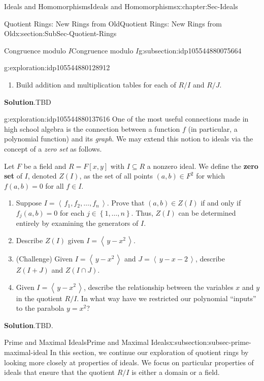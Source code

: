 \documentclass[oneside,10pt,]{book}
\newcommand{\blocktitlefont}{\relax}
\newcommand{\terminology}[1]{\textbf{#1}}
\numberwithin{equation}{section}
\newcommand{\ideal}[1]{\left\langle\, #1 \,\right\rangle}
\newcommand{\set}[1]{\left\{ {#1} \right\}}
\begin{document}
\begin{chapterptx}{Ideals and Homomorphisms}{}{Ideals and Homomorphisms}{}{}{x:chapter:Sec-Ideals}
\begin{sectionptx}{Quotient Rings: New Rings from Old}{}{Quotient Rings: New Rings from Old}{}{}{x:section:SubSec-Quotient-Rings}
\begin{subsectionptx}{Congruence modulo \(I\)}{}{Congruence modulo \(I\)}{}{}{g:subsection:idp105544880075664}
\begin{exploration}{}{g:exploration:idp105544880128912}
\begin{enumerate}
\item{}Build addition and multiplication tables for each of \(R/I\) and \(R/J\).%
\end{enumerate}
\par\smallskip%
\noindent\textbf{\blocktitlefont Solution}.\hypertarget{g:solution:idp105544880137360}{}\quad{}TBD\end{exploration}%
\begin{exploration}{}{g:exploration:idp105544880137616}%
%
%
One of the most useful connections made in high school algebra is the connection between a function \(f\) (in particular, a polynomial function) and its \emph{graph}. We may extend this notion to ideals via the concept of a \emph{zero set} as follows.%
\par
Let \(F\) be a field and \(R = F[x,y]\) with \(I\subseteq R\) a nonzero ideal. We define the \terminology{zero set} of \(I\), denoted \(Z(I)\), as the set of all points \((a,b)\in F^2\) for which \(f(a,b)=0\) for all \(f\in I\).%
%
\begin{enumerate}
\item{}Suppose \(I = \ideal{f_1, f_2, \ldots, f_n}\). Prove that \((a,b)\in Z(I)\) if and only if \(f_j(a,b) = 0\) for each \(j\in \set{1,\ldots, n}\). Thus, \(Z(I)\) can be determined entirely by examining the generators of \(I\).%
\item{}Describe \(Z(I)\) given \(I = \ideal{y-x^2}\).%
\item{}(Challenge) Given \(I = \ideal{y-x^2}\) and \(J = \ideal{y-x-2}\), describe \(Z(I+J)\) and \(Z(I\cap J)\).%
\item{}Given \(I=\ideal{y-x^2}\), describe the relationship between the variables \(x\) and \(y\) in the quotient \(R/I\). In what way have we restricted our polynomial ``inputs'' to the parabola \(y = x^2\)?%
\end{enumerate}
\par\smallskip%
\noindent\textbf{\blocktitlefont Solution}.\hypertarget{g:solution:idp105544880086288}{}\quad{}TBD.\end{exploration}%
\end{subsectionptx}
%
%
\typeout{************************************************}
\typeout{************************************************}
%
\begin{subsectionptx}{Prime and Maximal Ideals}{}{Prime and Maximal Ideals}{}{}{x:subsection:subsec-prime-maximal-ideal}
In this section, we continue our exploration of quotient rings by looking more closely at properties of ideals. We focus on particular properties of ideals that ensure that the quotient \(R/I\) is either a domain or a field.%

\end{subsectionptx}
\end{sectionptx}
\end{chapterptx}
\end{document}
